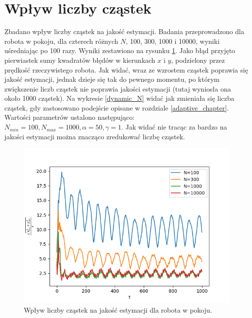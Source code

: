 \section{Wpływ liczby cząstek}
Zbadano wpływ liczby cząstek na jakość estymacji. Badania przeprowadzono dla  robota w pokoju, dla czterech różnych $N$, 100, 300, 1000 i 10000, wyniki uśredniając po 100 razy. Wyniki zestawiono na rysunku \ref{wplyw_N}. Jako błąd przyjęto pierwiastek sumy kwadratów błędów w kierunkach $x$ i $y$, podzielony przez prędkość rzeczywistego robota. Jak widać, wraz ze wzrostem cząstek poprawia się jakość estymacji, jednak dzieje się tak do pewnego momentu, po którym zwiększenie liczb cząstek nie poprawia jakości estymacji (tutaj wyniosła ona około 1000 cząstek). Na wykresie \ref{dynamic_N} widać jak zmieniała się liczba cząstek, gdy zastosowano podejście opisane w rozdziale \ref{adaptive_chapter}. Wartości parametrów ustalono następująco: $N_{min}=100, N_{max}=1000, \alpha = 50, \gamma = 1$.  Jak widać nie tracąc za bardzo na jakości estymacji można znacząco zredukować liczbę cząstek.

\begin{figure}[H]
	\begin{center}
		\includegraphics[width=12cm]{./wplyw_N.png}
		\caption{Wpływ liczby cząstek na jakość estymacji dla robota w pokoju.}
		\label{wplyw_N}
	\end{center}
\end{figure}

